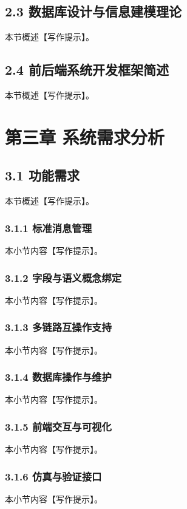 \section{2.3 数据库设计与信息建模理论}
本节概述【写作提示】。\cite{Ultra_ADSI_2024_update,CurtissWright_LinkPRO_page,Kao_Robertson_MILCOM_2008,CurtissWright_TCG_BOSS_2025}
\section{2.4 前后端系统开发框架简述}
本节概述【写作提示】。\cite{SAIC_JRE_Overview_2021,DLS_TTR_2016,DLS_TTR_webpage,Collins_TTR_webpage,L3Harris_STT_KOR24A_Page_2025,CurtissWright_TCG_LinkPRO_2025}

\chapter{第三章 系统需求分析}
\section{3.1 功能需求}
本节概述【写作提示】。\cite{CurtissWright_TCG_HUNTR_2020}
\subsection{3.1.1 标准消息管理}
本小节内容【写作提示】。\cite{Chelton_Link16_Antennas_2022}
\subsection{3.1.2 字段与语义概念绑定}
本小节内容【写作提示】。\cite{AFCEA_Link16_Improvements_2022}
\subsection{3.1.3 多链路互操作支持}
本小节内容【写作提示】。\cite{Lekkakos_2008}
\subsection{3.1.4 数据库操作与维护}
本小节内容【写作提示】。\cite{Ho_2008}
\subsection{3.1.5 前端交互与可视化}
本小节内容【写作提示】。\cite{Kao_2008}
\subsection{3.1.6 仿真与验证接口}
本小节内容【写作提示】。\cite{Kagioglidis_2009}

